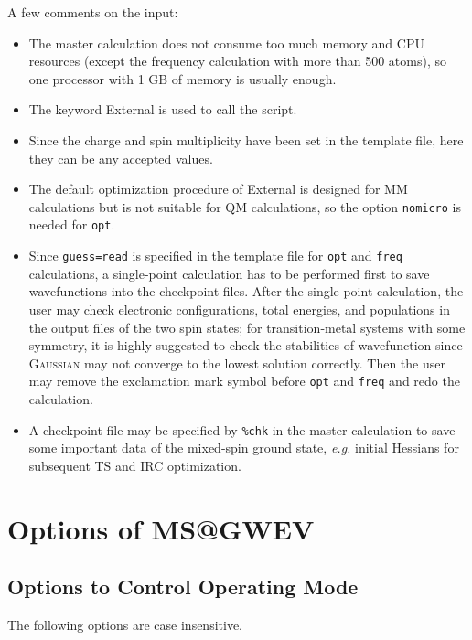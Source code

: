 \documentclass[UTF8]{article}
\begin{document}
A few comments on the input:
\begin{itemize}
\item The master calculation does not consume too much memory and CPU resources (except the frequency calculation with more than 500 atoms),
so one processor with 1 GB of memory is usually enough.
\item The keyword \textsf{External} is used to call the script.
\item Since the charge and spin multiplicity have been set in the template file, here they can be any accepted values.
\item The default optimization procedure of \textsf{External} is designed for MM calculations but is not suitable for QM calculations, so the option \verb|nomicro| is needed for \verb|opt|.
\item Since \verb|guess=read| is specified in the template file for \verb|opt| and \verb|freq| calculations, a single-point calculation
    has to be performed first to save wavefunctions into the checkpoint files.
    After the single-point calculation, the user may check electronic configurations, total energies, and populations in the output files of the two spin states; for transition-metal systems with some symmetry, it is highly suggested to check the stabilities of wavefunction since \textsc{Gaussian}
    may not converge to the lowest solution correctly.
    Then the user may remove the exclamation mark symbol before \verb|opt| and \verb|freq| and redo the calculation.
\item A checkpoint file may be specified by \verb|%chk| in the master calculation to save some important data of the mixed-spin ground state,
    \textit{e.g.} initial Hessians for subsequent TS and IRC optimization.
\end{itemize}

\section{Options of MS@GWEV}

\subsection{Options to Control Operating Mode}

The following options are case insensitive.
\end{document}
